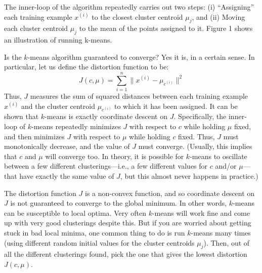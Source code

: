 The inner-loop of the algorithm repeatedly carries out two steps: (i)
``Assigning'' each training example $x^{(i)}$ to the closest cluster centroid $\mu_j$, and
(ii) Moving each cluster centroid $\mu_j$ to the mean of the points assigned to it.
Figure 1 shows an illustration of running k-means.

Is the $k$-means algorithm guaranteed to converge? Yes it is, in a certain
sense. In particular, let us define the distortion function to be:
\begin{equation*}
    J(c,\mu) = \sum^n_{i=1} \lVert x^{(i)} - \mu_{c^{(i)}} \rVert^2
\end{equation*}
Thus, $J$ measures the sum of squared distances between each training
example $x^{(i)}$ and the cluster centroid $\mu_{c^{(i)}}$ to which it has been assigned. It can
be shown that $k$-means is exactly coordinate descent on $J$. Specifically, the
inner-loop of $k$-means repeatedly minimizes $J$ with respect to $c$ while holding
$\mu$ fixed, and then minimizes $J$ with respect to $\mu$ while holding $c$ fixed. Thus,
$J$ must monotonically decrease, and the value of $J$ must converge. (Usually,
this implies that $c$ and $\mu$ will converge too. In theory, it is possible for
$k$-means to oscillate between a few different clusterings---i.e., a few different
values for $c$ and/or $\mu$---that have exactly the same value of $J$, but this almost
never happens in practice.)

The distortion function $J$ is a non-convex function, and so coordinate
descent on $J$ is not guaranteed to converge to the global minimum. In other
words, $k$-means can be susceptible to local optima. Very often $k$-means will
work fine and come up with very good clusterings despite this. But if you
are worried about getting stuck in bad local minima, one common thing to
do is run $k$-means many times (using different random initial values for the
cluster centroids $\mu_j$). Then, out of all the different clusterings found, pick
the one that gives the lowest distortion $J(c,\mu)$.



